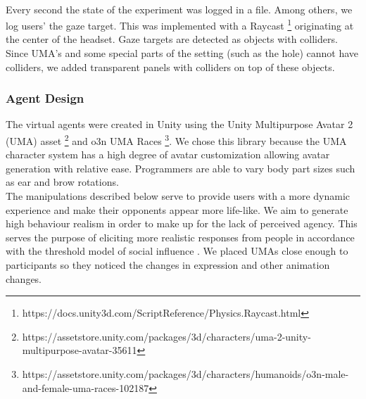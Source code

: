 \\
Every second the state of the experiment was logged in a file. Among others, we log users' the gaze target. This was implemented with a Raycast \footnote{https://docs.unity3d.com/ScriptReference/Physics.Raycast.html} originating at the center of the headset. Gaze targets are detected as objects with colliders. Since UMA's and some special parts of the setting (such as the hole) cannot have colliders, we added transparent panels with colliders on top of these objects.
\subsubsection{Agent Design}
\label{section:AgentDesign}

The virtual agents were created in Unity using the Unity Multipurpose Avatar 2 (UMA) asset \footnote{https://assetstore.unity.com/packages/3d/characters/uma-2-unity-multipurpose-avatar-35611} and o3n UMA Races \footnote{https://assetstore.unity.com/packages/3d/characters/humanoids/o3n-male-and-female-uma-races-102187}. We chose this library because the UMA character system has a high degree of avatar customization allowing avatar generation with relative ease. Programmers are able to vary body part sizes such as ear and brow rotations. 
\\
The manipulations described below serve to provide users with a more dynamic experience and make their opponents appear more life-like. We aim to generate high behaviour realism in order to make up for the lack of perceived agency. This serves the purpose of eliciting more realistic responses from people in accordance with the threshold model of social influence \cite{blascovich2002theoretical}. We placed UMAs close enough to participants so they noticed the changes in expression and other animation changes.

